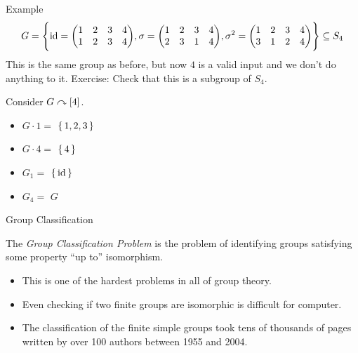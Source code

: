 \documentclass[aspectratio=169]{beamer}
\begin{document}
\begin{frame}{Example}
    \[
       G = \Bigg\{  { \operatorname{id} = \begin{pmatrix} 1 & 2 & 3 & 4 \\ 1 & 2 & 3 & 4 \end{pmatrix}}, \sigma =  {\begin{pmatrix} 1 & 2 & 3 & 4 \\ 2 & 3 & 1 & 4 \end{pmatrix}},  { \sigma^2 = \begin{pmatrix} 1 & 2 & 3 & 4 \\ 3 & 1 & 2 & 4 \end{pmatrix}}  \Bigg\}  \subseteq S_4
    \]
    This is the same group as before, but now $4$ is a valid input and we don't do anything to it.
    \textcolor{sigma@alertred}{Exercise:} Check that this is a subgroup of $S_4$.

    Consider $G \curvearrowright [4]$.

    \begin{itemize}
        \item $G \cdot 1 = $ \pause $\set{1, 2, 3}$ \pause
        \item $G \cdot 4 = $ \pause $\set{4}$       \pause
        \item $G_1 = $       \pause $\set{\operatorname{id}}$     \pause
        \item $G_4 = $       \pause $G$
    \end{itemize}
\end{frame}

\begin{frame}{Group Classification}
    \begin{center}
        The \emph{Group Classification Problem} is the problem of identifying groups satisfying some property ``up to'' isomorphism.
    \end{center} \pause

    \vspace{40pt}

    \begin{itemize}
        \item This is one of the hardest problems in all of group theory. \pause
        \item Even checking if two finite groups are isomorphic is difficult for computer. \pause
        \item The classification of the finite simple groups took tens of thousands of pages written by over 100 authors between 1955 and 2004.
    \end{itemize}
\end{frame}
\end{document}
